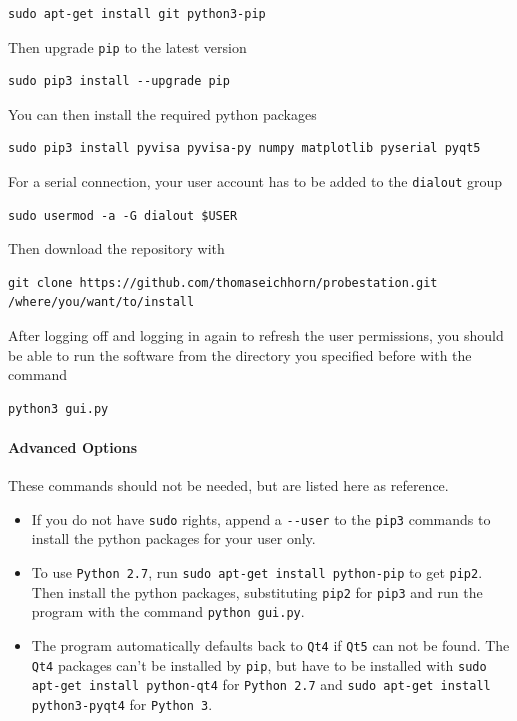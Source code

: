 \documentclass[a4paper]{article}
\begin{document}
\medskip
\begin{lstlisting}
sudo apt-get install git python3-pip
\end{lstlisting}
\medskip

Then upgrade {\tt pip} to the latest version

\medskip
\begin{lstlisting}
sudo pip3 install --upgrade pip
\end{lstlisting}
\medskip

You can then install the required python packages

\medskip
\begin{lstlisting}
sudo pip3 install pyvisa pyvisa-py numpy matplotlib pyserial pyqt5
\end{lstlisting}
\medskip

For a serial connection, your user account has to be added to the {\tt dialout} group

\medskip
\begin{lstlisting}
sudo usermod -a -G dialout $USER
\end{lstlisting}
\medskip

Then download the repository with

\medskip
\begin{lstlisting}
git clone https://github.com/thomaseichhorn/probestation.git /where/you/want/to/install
\end{lstlisting}
\medskip

After logging off and logging in again to refresh the user permissions, you should be able to run the software from the directory you specified before with the command

\medskip
\begin{lstlisting}
python3 gui.py
\end{lstlisting}
\medskip

\paragraph{Advanced Options\\}
These commands should not be needed, but are listed here as reference.

\begin{itemize}
\item{} If you do not have {\tt sudo} rights, append a {\tt -{}-user} to the {\tt pip3} commands to install the python packages for your user only.

\item{} To use {\tt Python 2.7}, run {\tt sudo apt-get install python-pip} to get {\tt pip2}.
Then install the python packages, substituting {\tt pip2} for {\tt pip3} and run the program with the command {\tt python gui.py}.

\item{} The program automatically defaults back to {\tt Qt4} if {\tt Qt5} can not be found.
The {\tt Qt4} packages can't be installed by {\tt pip}, but have to be installed with {\tt sudo apt-get install python-qt4} for {\tt Python 2.7} and {\tt sudo apt-get install python3-pyqt4} for {\tt Python 3}.
\end{itemize}
\end{document}
